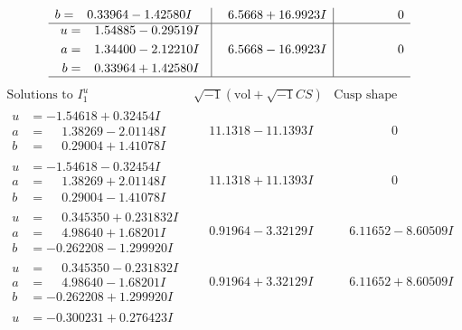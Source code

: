 \documentclass[1p]{elsarticle_modified}
\theoremstyle{definition}
\newcommand{\I}{\sqrt{-1}}
\begin{document}
$$\begin{array}{c|c|c}
\begin{aligned}
b &= \phantom{-}0.33964 - 1.42580 I\end{aligned}
 & \phantom{-}6.5668 + 16.9923 I & \phantom{-0.000000 } 0 \\ \hline\begin{aligned}
u &= \phantom{-}1.54885 - 0.29519 I \\
a &= \phantom{-}1.34400 - 2.12210 I \\
b &= \phantom{-}0.33964 + 1.42580 I\end{aligned}
 & \phantom{-}6.5668 - 16.9923 I & \phantom{-0.000000 } 0\\
 \hline 
 \end{array}$$\newpage$$\begin{array}{c|c|c}  
\text{Solutions to }I^u_{1}& \I (\text{vol} + \sqrt{-1}CS) & \text{Cusp shape}\\
 \hline 
\begin{aligned}
u &= -1.54618 + 0.32454 I \\
a &= \phantom{-}1.38269 - 2.01148 I \\
b &= \phantom{-}0.29004 + 1.41078 I\end{aligned}
 & \phantom{-}11.1318 - 11.1393 I & \phantom{-0.000000 } 0 \\ \hline\begin{aligned}
u &= -1.54618 - 0.32454 I \\
a &= \phantom{-}1.38269 + 2.01148 I \\
b &= \phantom{-}0.29004 - 1.41078 I\end{aligned}
 & \phantom{-}11.1318 + 11.1393 I & \phantom{-0.000000 } 0 \\ \hline\begin{aligned}
u &= \phantom{-}0.345350 + 0.231832 I \\
a &= \phantom{-}4.98640 + 1.68201 I \\
b &= -0.262208 - 1.299920 I\end{aligned}
 & \phantom{-}0.91964 - 3.32129 I & \phantom{-}6.11652 - 8.60509 I \\ \hline\begin{aligned}
u &= \phantom{-}0.345350 - 0.231832 I \\
a &= \phantom{-}4.98640 - 1.68201 I \\
b &= -0.262208 + 1.299920 I\end{aligned}
 & \phantom{-}0.91964 + 3.32129 I & \phantom{-}6.11652 + 8.60509 I \\ \hline\begin{aligned}
u &= -0.300231 + 0.276423 I \\

\end{aligned}
\end{array}$$
\end{document}
